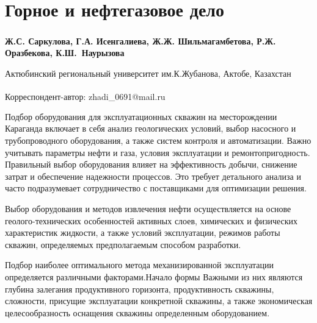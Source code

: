 \newpage
\let\cleardoublepage\clearpage
\chapter{Горное и нефтегазовое дело}

\begin{articleheader}

{\bfseries
Ж.С. Саркулова\textsuperscript{\envelope },
Г.А. Исенгалиева,
Ж.Ж. Шильмагамбетова,
Р.Ж. Оразбекова,
К.Ш.~Наурызова
}
\end{articleheader}

\begin{affiliation}
Актюбинский региональный университет им.К.Жубанова, Актобе, Казахстан

\raggedright \textsuperscript{\envelope }Корреспондент-автор: zhadi\_0691@mail.ru
\end{affiliation}

Подбор оборудования для эксплуатационных скважин на месторождении
Караганда включает в себя анализ геологических условий, выбор насосного
и трубопроводного оборудования, а также систем контроля и автоматизации.
Важно учитывать параметры нефти и газа, условия эксплуатации и
ремонтопригодность. Правильный выбор оборудования влияет на
эффективность добычи, снижение затрат и обеспечение надежности
процессов. Это требует детального анализа и часто подразумевает
сотрудничество с поставщиками для оптимизации решения.

Выбор оборудования и методов извлечения нефти осуществляется на основе
геолого-технических особенностей активных слоев, химических и физических
характеристик жидкости, а также условий эксплуатации, режимов работы
скважин, определяемых предполагаемым способом разработки.

Подбор наиболее оптимального метода механизированной эксплуатации
определяется различными факторами.Начало формы Важными из них являются
глубина залегания продуктивного горизонта, продуктивность скважины,
сложности, присущие эксплуатации конкретной скважины, а также
экономическая целесообразность оснащения скважины определенным
оборудованием.

